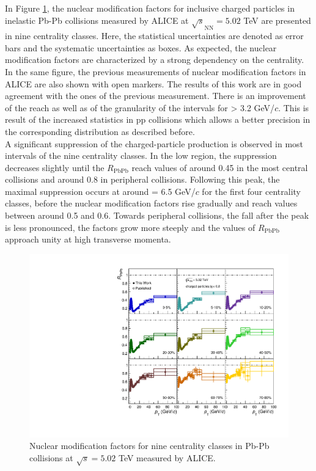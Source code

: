 \documentclass[12pt,a4paper]{report}
\begin{document}
In Figure \ref{Raa}, the nuclear modification factors for inclusive charged particles in inelastic Pb-Pb collisions measured by ALICE at $\sqrt{s}_\text{NN}=5.02$ TeV are presented in nine centrality classes. Here, the statistical uncertainties are denoted as error bars and the systematic uncertainties as boxes. As expected, the nuclear modification factors are characterized by a strong dependency on the centrality. In the same figure, the previous measurements of nuclear modification factors in ALICE are also shown with open markers. The results of this work are in good agreement with the ones of the previous measurement. There is an improvement of the \pt reach as well as of the granularity of the intervals for \pt > 3.2 GeV/$c$. This is result of the increased statistics in pp collisions which allows a better precision in the corresponding \pt distribution as described before.\\
A significant suppression of the charged-particle production is observed in most \pt intervals of the nine centrality classes. In the low \pt region, the suppression decreases slightly until the $R_\text{PbPb}$ reach values of around 0.45 in the most central collisions and around 0.8 in peripheral collisions. Following this peak, the maximal suppression occurs at around \pt = 6.5 GeV/$c$ for the first four centrality classes, before the nuclear modification factors rise gradually and reach values between around 0.5 and 0.6. Towards peripheral collisions, the fall after the peak is less pronounced, the factors grow more steeply and the values of $R_\text{PbPb}$ approach unity at high transverse momenta. 
\begin{figure}[tb!]
\centering
\includegraphics[width=12cm]{Plots/Raa.pdf}  
\caption{Nuclear modification factors for nine centrality classes in Pb-Pb collisions at $\sqrt{s}=5.02$ TeV measured by ALICE.}
\label{Raa}
\end{figure}
\end{document}
